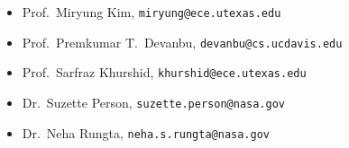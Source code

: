 \documentclass[overlapped,line,letterpaper, 12pt]{res}
\begin{document}
\begin{resume}
\begin{itemize}
\item
Prof.~Miryung Kim,  {\tt miryung@ece.utexas.edu}
\item
Prof.~Premkumar T.~Devanbu, {\tt devanbu@cs.ucdavis.edu}
\item
Prof.~Sarfraz Khurshid, {\tt khurshid@ece.utexas.edu}
\item
Dr.~Suzette Person, {\tt suzette.person@nasa.gov}
\item
Dr.~Neha Rungta, {\tt neha.s.rungta@nasa.gov}

\end{itemize}




\end{resume}
\end{document}
